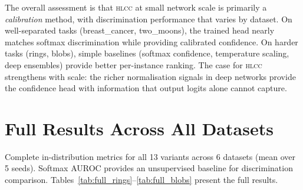 \documentclass[11pt,a4paper]{article}
\newcommand{\hlcc}{\textsc{hlcc}}
\begin{document}
The overall assessment is that \hlcc{} at small network scale is
primarily a \emph{calibration} method, with discrimination performance
that varies by dataset.  On well-separated tasks (breast\_cancer,
two\_moons), the trained head nearly matches softmax discrimination
while providing calibrated confidence.  On harder tasks (rings, blobs),
simple baselines (softmax confidence, temperature scaling, deep
ensembles) provide better per-instance ranking.  The case for \hlcc{}
strengthens with scale: the richer normalisation signals in deep
networks provide the confidence head with information that output
logits alone cannot capture.




\appendix

\section{Full Results Across All Datasets}
\label{app:full}

Complete in-distribution metrics for all 13 variants across 6 datasets
(mean over 5 seeds).  Softmax AUROC provides an unsupervised baseline
for discrimination comparison.  Tables~\ref{tab:full_rings}--\ref{tab:full_blobs}
present the full results.
\end{document}
